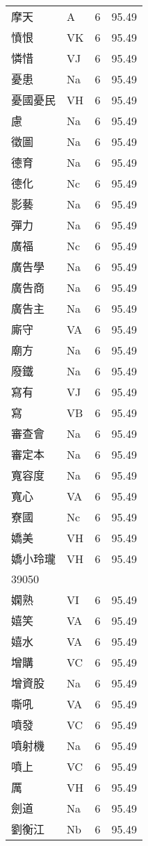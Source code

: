\documentclass[twocolumn]{book}
\begin{document}
\begin{supertabular}{llrr}
摩天 & A & 6 &  95.49\\
憤恨 & VK & 6 &  95.49\\
憐惜 & VJ & 6 &  95.49\\
憂患 & Na & 6 &  95.49\\
憂國憂民 & VH & 6 &  95.49\\
慮 & Na & 6 &  95.49\\
徵圖 & Na & 6 &  95.49\\
德育 & Na & 6 &  95.49\\
德化 & Nc & 6 &  95.49\\
影藝 & Na & 6 &  95.49\\
彈力 & Na & 6 &  95.49\\
廣福 & Nc & 6 &  95.49\\
廣告學 & Na & 6 &  95.49\\
廣告商 & Na & 6 &  95.49\\
廣告主 & Na & 6 &  95.49\\
廝守 & VA & 6 &  95.49\\
廟方 & Na & 6 &  95.49\\
廢鐵 & Na & 6 &  95.49\\
寫有 & VJ & 6 &  95.49\\
寫 & VB & 6 &  95.49\\
審查會 & Na & 6 &  95.49\\
審定本 & Na & 6 &  95.49\\
寬容度 & Na & 6 &  95.49\\
寬心 & VA & 6 &  95.49\\
寮國 & Nc & 6 &  95.49\\
嬌美 & VH & 6 &  95.49\\
嬌小玲瓏 & VH & 6 &  95.49\\
39050\\
嫻熟 & VI & 6 &  95.49\\
嬉笑 & VA & 6 &  95.49\\
嬉水 & VA & 6 &  95.49\\
增購 & VC & 6 &  95.49\\
增資股 & Na & 6 &  95.49\\
嘶吼 & VA & 6 &  95.49\\
噴發 & VC & 6 &  95.49\\
噴射機 & Na & 6 &  95.49\\
噴上 & VC & 6 &  95.49\\
厲 & VH & 6 &  95.49\\
劍道 & Na & 6 &  95.49\\
劉衡江 & Nb & 6 &  95.49\\

\end{supertabular}
\end{document}
